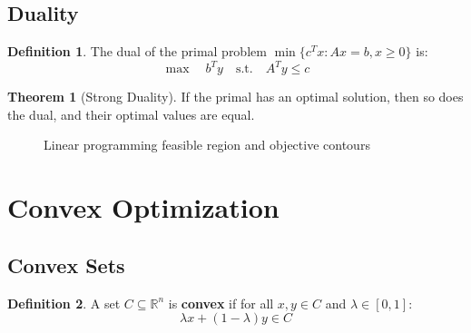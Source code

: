 \documentclass[11pt]{article}
\theoremstyle{definition}
\newtheorem{definition}{Definition}[section]
\newtheorem{theorem}{Theorem}[section]
\begin{document}
\subsection{Duality}
\begin{definition}
The dual of the primal problem $\min\{c^T x : Ax = b, x \geq 0\}$ is:
$$\max \quad b^T y \quad \text{s.t.} \quad A^T y \leq c$$
\end{definition}

\begin{theorem}[Strong Duality]
If the primal has an optimal solution, then so does the dual, and their optimal values are equal.
\end{theorem}

\begin{figure}[h]
\centering
{}
\caption{Linear programming feasible region and objective contours}
\end{figure}

\section{Convex Optimization}

\subsection{Convex Sets}
\begin{definition}
A set $C \subseteq \mathbb{R}^n$ is \textbf{convex} if for all $x, y \in C$ and $\lambda \in [0,1]$:
$$\lambda x + (1-\lambda) y \in C$$
\end{definition}
\end{document}
